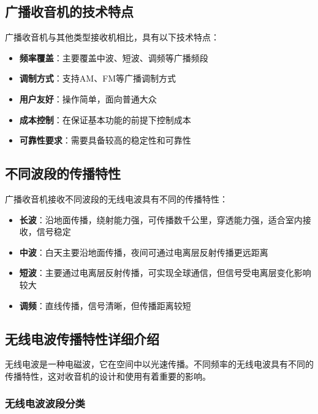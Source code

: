 \documentclass[12pt,UTF8]{ctexbook}
\begin{document}
\subsection{广播收音机的技术特点}

广播收音机与其他类型接收机相比，具有以下技术特点：

\begin{itemize}[leftmargin=3.5em]
    \item \textbf{频率覆盖}：主要覆盖中波、短波、调频等广播频段
    \item \textbf{调制方式}：支持AM、FM等广播调制方式
    \item \textbf{用户友好}：操作简单，面向普通大众
    \item \textbf{成本控制}：在保证基本功能的前提下控制成本
    \item \textbf{可靠性要求}：需要具备较高的稳定性和可靠性
\end{itemize}

\subsection{不同波段的传播特性}

广播收音机接收不同波段的无线电波具有不同的传播特性：

\begin{itemize}[leftmargin=3.5em]
    \item \textbf{长波}：沿地面传播，绕射能力强，可传播数千公里，穿透能力强，适合室内接收，信号稳定
    \item \textbf{中波}：白天主要沿地面传播，夜间可通过电离层反射传播更远距离
    \item \textbf{短波}：主要通过电离层反射传播，可实现全球通信，但信号受电离层变化影响较大
    \item \textbf{调频}：直线传播，信号清晰，但传播距离较短
\end{itemize}

\subsection{无线电波传播特性详细介绍}

无线电波是一种电磁波，它在空间中以光速传播。不同频率的无线电波具有不同的传播特性，这对收音机的设计和使用有着重要的影响。

\subsubsection{无线电波波段分类}
\end{document}
